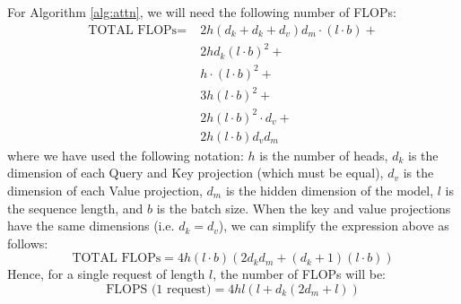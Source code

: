 For Algorithm \ref{alg:attn}, we will need the following number of FLOPs:
\begin{align}
    \text{TOTAL FLOPs} = \; & 2 h (d_k + d_k + d_v) d_m \cdot (l \cdot b) + \\
    & 2 h d_k (l \cdot b)^2 + \\
    & h \cdot (l \cdot b)^2 + \\
    & 3h(l \cdot b)^2 + \\
    & 2h (l \cdot b)^2 \cdot d_v + \\
    & 2h(l \cdot b) d_v d_m
\end{align}
where we have used the following notation: $h$ is the number of heads, $d_k$ is the dimension of each Query and Key projection (which must be equal), $d_v$ is the dimension of each Value projection, $d_m$ is the hidden dimension of the model, $l$ is the sequence length, and $b$ is the batch size. When the key and value projections have the same dimensions (i.e. $d_k = d_v$), we can simplify the expression above as follows:
\begin{equation}
    \text{TOTAL FLOPs} = 4h (l \cdot b)(2 d_k d_m + (d_k + 1) (l \cdot b))
\end{equation}
Hence, for a single request of length $l$, the number of FLOPs will be:
\begin{equation}\label{final-eq-old}
    \text{FLOPS (1 request)} = 4 h l (l + d_k (2 d_m + l))
\end{equation}

